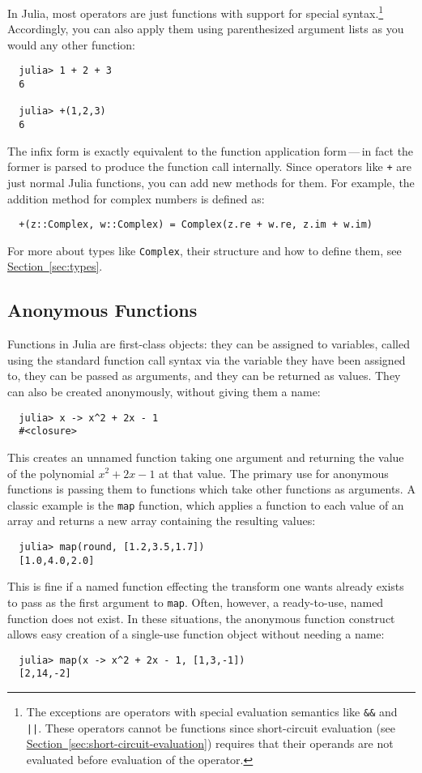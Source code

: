 \documentclass{article}
\renewcommand{\sec}[1]{\label{sec:#1}}
\newcommand{\Section}[1]{\hyperref[sec:#1]{Section~\ref*{sec:#1}}}
\begin{document}
In Julia, most operators are just functions with support for special syntax.\footnote{The exceptions are operators with special evaluation semantics like \texttt{\&\&} and \texttt{||}.
These operators cannot be functions since short-circuit evaluation (see \Section{short-circuit-evaluation}) requires that their operands are not evaluated before evaluation of the operator.}
Accordingly, you can also apply them using parenthesized argument lists as you would any other function:
\begin{verbatim}
  julia> 1 + 2 + 3
  6

  julia> +(1,2,3)
  6
\end{verbatim}
The infix form is exactly equivalent to the function application form\,---\,in fact the former is parsed to produce the function call internally.
Since operators like \verb|+| are just normal Julia functions, you can add new methods for them.
For example, the addition method for complex numbers is defined as:
\begin{verbatim}
  +(z::Complex, w::Complex) = Complex(z.re + w.re, z.im + w.im)
\end{verbatim}
For more about types like \verb|Complex|, their structure and how to define them, see \Section{types}.

\subsection{Anonymous Functions}\sec{anonymous-functions}

Functions in Julia are first-class objects:
they can be assigned to variables, called using the standard function call syntax via the variable they have been assigned to, they can be passed as arguments, and they can be returned as values.
They can also be created anonymously, without giving them a name:
\begin{verbatim}
  julia> x -> x^2 + 2x - 1
  #<closure>
\end{verbatim}
This creates an unnamed function taking one argument and returning the value of the polynomial $x^2 + 2x - 1$ at that value.
The primary use for anonymous functions is passing them to functions which take other functions as arguments.
A classic example is the \verb|map| function, which applies a function to each value of an array and returns a new array containing the resulting values:
\begin{verbatim}
  julia> map(round, [1.2,3.5,1.7])
  [1.0,4.0,2.0]
\end{verbatim} %
This is fine if a named function effecting the transform one wants already exists to pass as the first argument to \verb|map|.
Often, however, a ready-to-use, named function does not exist.
In these situations, the anonymous function construct allows easy creation of a single-use function object without needing a name:
\begin{verbatim}
  julia> map(x -> x^2 + 2x - 1, [1,3,-1])
  [2,14,-2]
\end{verbatim}
\end{document}
